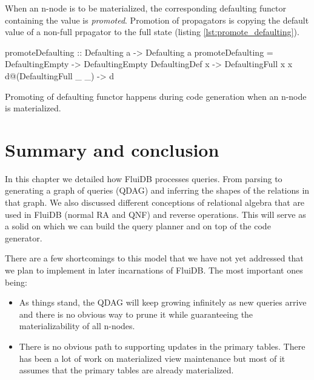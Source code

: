 When an n-node is to be materialized, the corresponding defaulting
functor containing the value is \emph{promoted}.  Promotion of
propagators is copying the default value of a non-full prpagator to
the full state (listing \ref{lst:promote_defaulting}).


\begin{code}
  \begin{haskellcode}
    promoteDefaulting :: Defaulting a -> Defaulting a
    promoteDefaulting = \case
      DefaultingEmpty        -> DefaultingEmpty
      DefaultingDef x        -> DefaultingFull x x
      d@(DefaultingFull _ _) -> d
  \end{haskellcode}

  \caption{\label{lst:promote_defaulting}Promoting of defaulting functor happens
    during code generation when an n-node is materialized.}
\end{code}

\section{Summary and conclusion}

In this chapter we detailed how FluiDB processes queries. From
parsing to generating a graph of queries (QDAG) and inferring the
shapes of the relations in that graph. We also discussed different
conceptions of relational algebra that are used in FluiDB (normal RA
and QNF) and reverse operations. This will serve as a solid  on
which we can build the query planner and on top of the code generator.

There are a few shortcomings to this model that we have not yet
addressed that we plan to implement in later incarnations of
FluiDB. The most important ones being:

\begin{itemize}
\item As things stand, the QDAG will keep growing infinitely as new
  queries arrive and there is no obvious way to prune it while
  guaranteeing the materializability of all n-nodes.
\item There is no obvious path to supporting updates in the primary
  tables. There has been a lot of work on materialized view
  maintenance but most of it assumes that the primary tables are
  already materialized.
\end{itemize}
